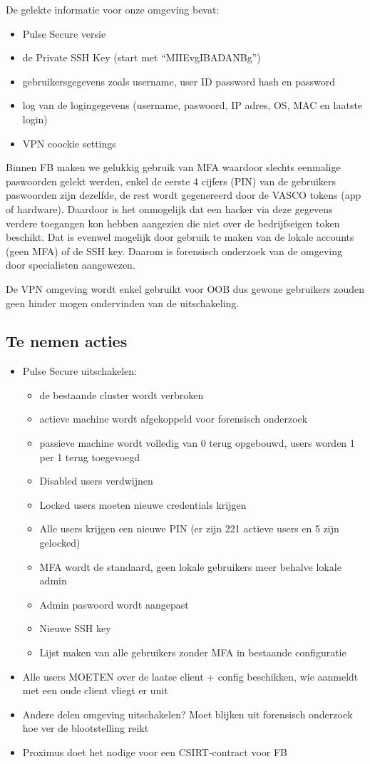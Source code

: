 \documentclass[11pt]{article}
\begin{document}
De gelekte informatie voor onze omgeving bevat:
\begin{itemize}
\item Pulse Secure versie
\item de Private SSH Key (start met “MIIEvgIBADANBg”)
\item gebruikersgegevens zoals username, user ID password hash en password
\item log van de logingegevens (username, paswoord, IP adres, OS, MAC en laatste login)
\item VPN coockie settings
\end{itemize}

Binnen FB maken we gelukkig gebruik van MFA waardoor slechts eenmalige paswoorden gelekt werden, enkel de eerste 4 cijfers (PIN) van de gebruikers paswoorden zijn dezelfde, de rest wordt gegenereerd door de VASCO tokens (app of hardware). Daardoor is het onmogelijk dat een hacker via deze gegevens verdere toegangen kon hebben aangezien die niet over de bedrijfseigen token beschikt. Dat is evenwel mogelijk door gebruik te maken van de lokale accounts (geen MFA) of de SSH key.
Daarom is forensisch onderzoek van de omgeving door specialisten aangewezen.

De VPN omgeving wordt enkel gebruikt voor OOB dus gewone gebruikers zouden geen hinder mogen ondervinden van de uitschakeling.

\subsection{Te nemen acties}
\label{sec:org5772b9c}
\begin{itemize}
\item Pulse Secure uitschakelen:
\begin{itemize}
\item de bestaande cluster wordt verbroken
\item actieve machine wordt afgekoppeld voor forensisch onderzoek
\item passieve machine wordt volledig van 0 terug opgebouwd, users worden 1 per 1 terug toegevoegd
\item Disabled users verdwijnen
\item Locked users moeten nieuwe credentials krijgen
\item Alle users krijgen een nieuwe PIN (er zijn 221 actieve users en 5 zijn gelocked)
\item MFA wordt de standaard, geen lokale gebruikers meer behalve lokale admin
\item Admin paswoord wordt aangepast
\item Nieuwe SSH key
\item Lijst maken van alle gebruikers zonder MFA in bestaande configuratie
\end{itemize}
\item Alle users MOETEN over de laatse client + config beschikken, wie aanmeldt met een oude client vliegt er uuit
\item Andere delen omgeving uitschakelen? Moet blijken uit forensisch onderzoek hoe ver de blootstelling reikt
\item Proximus doet het nodige voor een CSIRT-contract voor FB
\end{itemize}
\end{document}

